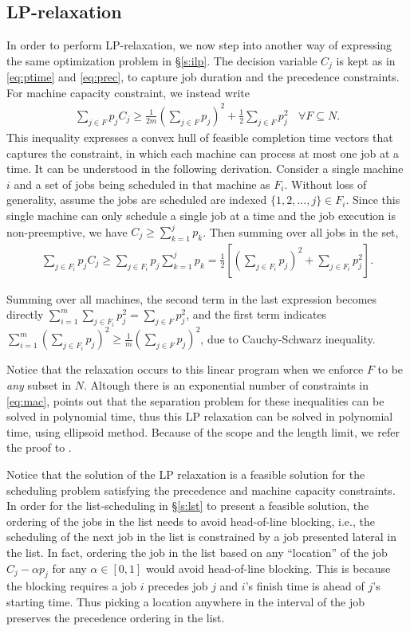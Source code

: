 \subsection{LP-relaxation} \label{s:lprd}
In order to perform LP-relaxation, we now step into another way of expressing the same optimization problem in \S\ref{s:ilp}. The decision variable $C_j$ is kept as in \eqref{eq:ptime} and \eqref{eq:prec}, to capture job duration and the precedence constraints. For machine capacity constraint, we instead write
\begin{align}
\sum_{j\in F} p_j C_j \geq \frac{1}{2m}\left(\sum_{j\in F} p_j \right)^2 + \frac{1}{2}\sum_{j\in F}p_j^2 \:\:\:\: \forall F \subseteq N. \label{eq:mac}
\end{align}
This inequality expresses a convex hull of feasible completion time vectors that captures the constraint, in which each machine can process at most one job at a time. It can be understood in the following derivation. Consider a single machine $i$ and a set of jobs being scheduled in that machine as $F_i$. Without loss of generality, assume the jobs are scheduled are indexed $\{1,2,...,j\} \in F_i$. Since this single machine can only schedule a single job at a time and the job execution is non-preemptive, we have $C_j \geq \sum_{k=1}^j p_k$. Then summing over all jobs in the set, 
\begin{align}
\sum_{j\in F_i} p_j C_j \geq \sum_{j\in F_i} p_j \sum_{k=1}^j p_k = \frac{1}{2} \left[ \left(\sum_{j\in F_i} p_j\right)^2 + \sum_{j\in F_i}p_j^2\right]. \label{eq:ch}
\end{align}

Summing over all machines, the second term in the last expression becomes directly $\sum_{i=1}^m \sum_{j\in F_i}p_j^2 = \sum_{j\in F}p_j^2$, and the first term indicates $\sum_{i=1}^m\left(\sum_{j\in F_i} p_j\right)^2 \geq \frac{1}{m}\left(\sum_{j\in F} p_j\right)^2$, due to Cauchy-Schwarz inequality. 

Notice that the relaxation occurs to this linear program when we enforce $F$ to be \emph{any} subset in $N$. Altough there is an exponential number of constraints in \eqref{eq:mac}, \cite{queyranne2006approximation} points out that the separation problem for these inequalities can be solved in polynomial time, thus this LP relaxation can be solved in polynomial time, using ellipsoid method. Because of the scope and the length limit, we refer the proof to \cite{schulz1996scheduling}.

Notice that the solution of the LP relaxation is a feasible solution for the scheduling problem satisfying the precedence and machine capacity constraints. In order for the list-scheduling in \S\ref{s:lst} to present a feasible solution, the ordering of the jobs in the list needs to avoid head-of-line blocking, i.e., the scheduling of the next job in the list is constrained by a job presented lateral in the list. In fact, ordering the job in the list based on any ``location'' of the job $C_j - \alpha p_j$ for any $\alpha \in [0,1]$ would avoid head-of-line blocking. This is because the blocking requires a job $i$ precedes job $j$ and $i$'s finish time is ahead of $j$'s starting time. Thus picking a location anywhere in the interval of the job preserves the precedence ordering in the list.


